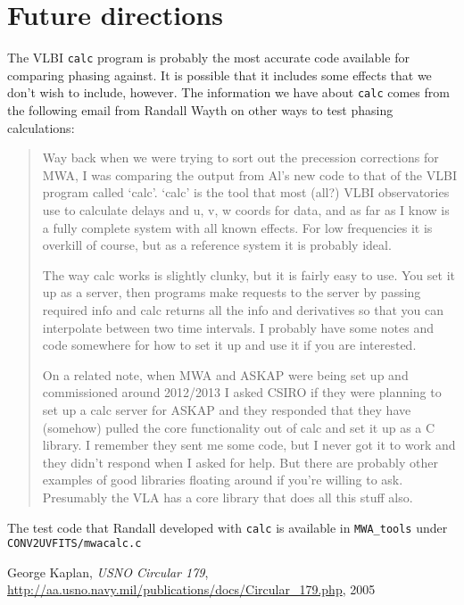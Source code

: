\documentclass[11pt, oneside]{article}   	%
\begin{document}
\section{Future directions}
The VLBI \texttt{calc} program is probably the most accurate code available for comparing phasing against. It is possible that it  includes some effects that we don't wish to include, however. The information we have about \texttt{calc} comes from the following email from Randall Wayth on other ways to test phasing calculations:
\begin{quotation}
Way back when we were trying to sort out the precession corrections for MWA, I was comparing the output from Al's new code to that of the VLBI program called `calc'. `calc' is the tool that most (all?) VLBI observatories use to calculate delays and u, v, w coords for data, and as far as I know is a fully complete system with all known effects. For low frequencies it is overkill of course, but as a reference system it is probably ideal.

The way calc works is slightly clunky, but it is fairly easy to use. You set it up as a server, then programs make requests to the server by passing required info and calc returns all the info and derivatives so that you can interpolate between two time intervals. I probably have some notes and code somewhere for how to set it up and use it if you are interested.

On a related note, when MWA and ASKAP were being set up and commissioned around 2012/2013 I asked CSIRO if they were planning to set up a calc server for ASKAP and they responded that they have (somehow) pulled the core functionality out of calc and set it up as a C library. I remember they sent me some code, but I never got it to work and they didn't respond when I asked for help. But there are probably other examples of good libraries floating around if you're willing to ask. Presumably the VLA has a core library that does all this stuff also.
\end{quotation}

The test code that Randall developed with \texttt{calc} is available in \verb!MWA_tools! under \verb!CONV2UVFITS/mwacalc.c!

\begin{thebibliography}{9}

  George Kaplan,
  \textit{USNO Circular 179},
  \href{http://aa.usno.navy.mil/publications/docs/Circular_179.php}{\url{http://aa.usno.navy.mil/publications/docs/Circular_179.php}},
  2005
  \end{thebibliography}
\end{document}

